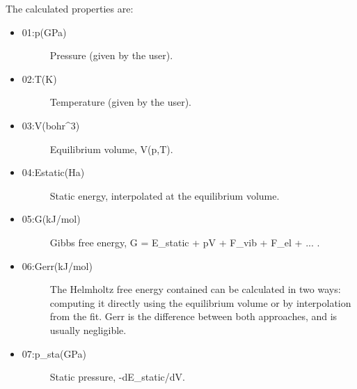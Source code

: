 \documentclass[a4paper]{article}
\begin{document}
The calculated properties are:
%
\begin{itemize}

\item %
\begin{description}
\item[{01:p(GPa)}] \leavevmode 
Pressure (given by the user).

\end{description}

\item %
\begin{description}
\item[{02:T(K)}] \leavevmode 
Temperature (given by the user).

\end{description}

\item %
\begin{description}
\item[{03:V(bohr\textasciicircum{}3)}] \leavevmode 
Equilibrium volume, V(p,T).

\end{description}

\item %
\begin{description}
\item[{04:Estatic(Ha)}] \leavevmode 
Static energy, interpolated at the equilibrium volume.

\end{description}

\item %
\begin{description}
\item[{05:G(kJ/mol)}] \leavevmode 
Gibbs free energy, G = E\_static + pV + F\_vib + F\_el + ... .

\end{description}

\item %
\begin{description}
\item[{06:Gerr(kJ/mol)}] \leavevmode 
The Helmholtz free energy contained can be calculated in two ways:
computing it directly using the equilibrium volume or by
interpolation from the fit. Gerr is the difference between both
approaches, and is usually negligible.

\end{description}

\item %
\begin{description}
\item[{07:p\_sta(GPa)}] \leavevmode 
Static pressure, -dE\_static/dV.


\end{description}
\end{itemize}
\end{document}
